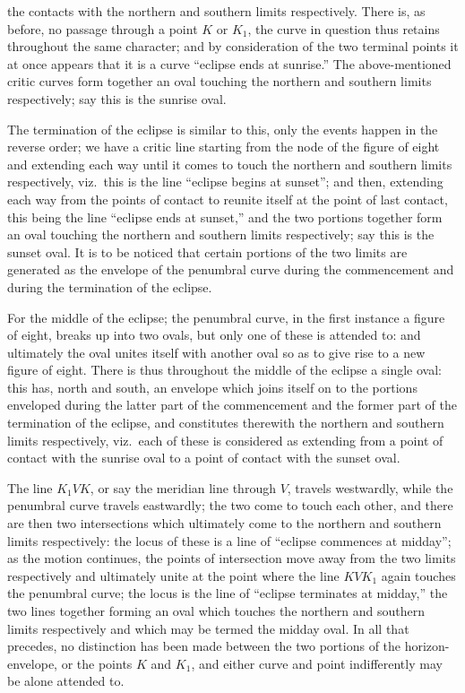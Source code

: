 \documentclass[11pt,a4paper]{article}
\begin{document}
\newpage


\noindent the contacts with the northern and southern limits respectively. There is, as before, no passage through a point $K$ or $K_{1}$, the curve in question thus retains throughout the same character; and by consideration of the two terminal points it at once appears that it is a curve ``eclipse ends at sunrise.'' The above-mentioned critic curves form together an oval touching the northern and southern limits respectively; say this is the sunrise oval.

\medskip

The termination of the eclipse is similar to this, only the events happen in the reverse order; we have a critic line starting from the node of the figure of eight and extending each way until it comes to touch the northern and southern limits respectively, viz.\ this is the line ``eclipse begins at sunset''; and then, extending each way from the points of contact to reunite itself at the point of last contact, this being the line ``eclipse ends at sunset,'' and the two portions together form an oval touching the northern and southern limits respectively; say this is the sunset oval. It is to be noticed that certain portions of the two limits are generated as the envelope of the penumbral curve during the commencement and during the termination of the eclipse.

\medskip

For the middle of the eclipse; the penumbral curve, in the first instance a figure of eight, breaks up into two ovals, but only one of these is attended to: and ultimately the oval unites itself with another oval so as to give rise to a new figure of eight. There is thus throughout the middle of the eclipse a single oval: this has, north and south, an envelope which joins itself on to the portions enveloped during the latter part of the commencement and the former part of the termination of the eclipse, and constitutes therewith the northern and southern limits respectively, viz.\ each of these is considered as extending from a point of contact with the sunrise oval to a point of contact with the sunset oval.

\medskip

The line $K_{1}VK$, or say the meridian line through $V$, travels westwardly, while the penumbral curve travels eastwardly; the two come to touch each other, and there are then two intersections which ultimately come to the northern and southern limits respectively: the locus of these is a line of ``eclipse commences at midday''; as the motion continues, the points of intersection move away from the two limits respectively and ultimately unite at the point where the line $KVK_{1}$ again touches the penumbral curve; the locus is the line of ``eclipse terminates at midday,'' the two lines together forming an oval which touches the northern and southern limits respectively and which may be termed the midday oval. In all that precedes, no distinction has been made between the two portions of the horizon-envelope, or the points $K$ and $K_{1}$, and either curve and point indifferently may be alone attended to.
\end{document}
